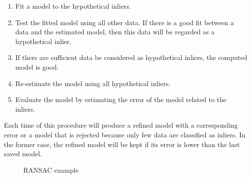\begin{enumerate}
    \item Fit a model to the hypothetical inliers.
    \item Test the fitted model using all other data. If there is a good fit between a data and the estimated model, then this data will be regarded as a hypothetical inlier.
    \item If there are sufficient data be considered as hypothetical inliers, the computed model is good.
    \item Re-estimate the model using all hypothetical inliers.
    \item Evaluate the model by estimating the error of the model related to the inliers.
\end{enumerate}

Each time of this procedure will produce a refined model with a corresponding error or a model that is rejected because only few data are classified as inliers. In the former case, the refined model will be kept if its error is lower than the last saved model.

\begin{figure}[H]
\centering
{}
\caption{RANSAC example \citep{random}}
\label{ransac}
\end{figure}

